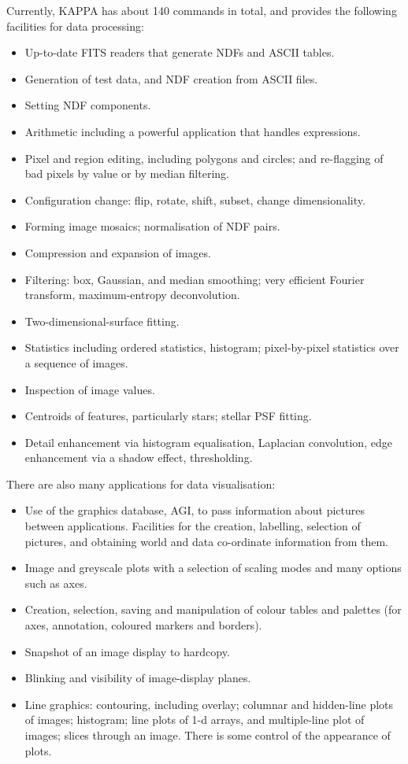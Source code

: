 Currently, {\small KAPPA} has about 140 commands in total, and provides
the following facilities for data processing:
\begin{itemize}
\item Up-to-date FITS readers that generate NDFs and ASCII tables.
\item Generation of test data, and NDF creation from ASCII files.
\item Setting NDF components.
\item Arithmetic including a powerful application that handles
expressions.
\item Pixel and region editing, including polygons and circles; and
re-flagging of bad pixels by value or by median filtering.
\item Configuration change: flip, rotate, shift, subset, change
dimensionality.
\item Forming image mosaics; normalisation of NDF pairs.
\item Compression and expansion of images.
\item Filtering: box, Gaussian, and median smoothing; very efficient
Fourier transform, maximum-entropy deconvolution.
\item Two-dimensional-surface fitting.
\item Statistics including ordered statistics, histogram; pixel-by-pixel
statistics over a sequence of images.
\item Inspection of image values.
\item Centroids of features, particularly stars; stellar PSF fitting.
\item Detail enhancement via histogram equalisation, Laplacian
convolution, edge enhancement via a shadow effect, thresholding.
\end{itemize}

There are also many applications for data visualisation:
\begin{itemize}
\item Use of the graphics database, AGI, to pass information about
pictures between applications.  Facilities for the creation, labelling,
selection of pictures, and obtaining world and data co-ordinate
information from them.
\item Image and greyscale plots with a selection
of scaling modes and many options such as axes.
\item Creation, selection, saving and manipulation of colour tables and
palettes (for axes, annotation, coloured markers and borders). 
\item Snapshot of an image display to hardcopy.
\item Blinking and visibility of image-display planes.
\item Line graphics: contouring, including overlay; columnar and
hidden-line plots of images; histogram; line plots of 1-d arrays, and
multiple-line plot of images; slices through an image.  There is some
control of the appearance of plots.
\end{itemize} 

